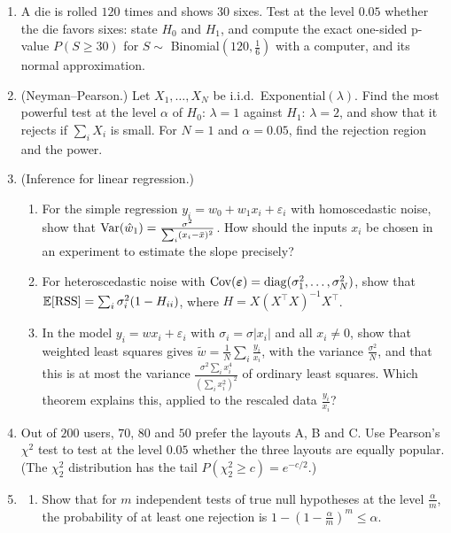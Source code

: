 \begin{enumerate}[leftmargin=*]
\begin{enumerate}[label=(\alph*)]
    \end{enumerate}
    \item \homework{} A die is rolled $120$ times and shows $30$ sixes. Test at the level $0.05$ whether the die favors sixes: state $H_0$ and $H_1$, and compute the exact one-sided p-value $P(S \geq 30)$ for $S \sim$ Binomial$(120, \frac{1}{6})$ with a computer, and its normal approximation.
    \item (Neyman--Pearson.) Let $X_1, \ldots, X_N$ be i.i.d.\ Exponential$(\lambda)$. Find the most powerful test at the level $\alpha$ of $H_0$: $\lambda = 1$ against $H_1$: $\lambda = 2$, and show that it rejects if $\sum_i X_i$ is small. For $N = 1$ and $\alpha = 0.05$, find the rejection region and the power.
    \item \homework{} (Inference for linear regression.)
    \begin{enumerate}[label=(\alph*)]
        \item For the simple regression $y_i = w_0 + w_1x_i + \varepsilon_i$ with homoscedastic noise, show that $\operatorname{Var}(\hat w_1) = \frac{\sigma^2}{\sum_i (x_i - \bar x)^2}$. How should the inputs $x_i$ be chosen in an experiment to estimate the slope precisely?
        \item For heteroscedastic noise with $\operatorname{Cov}(\boldsymbol{\varepsilon}) = \operatorname{diag}(\sigma_1^2, \ldots, \sigma_N^2)$, show that $\mathbb{E}[\mathrm{RSS}] = \sum_i \sigma_i^2(1 - H_{ii})$, where $H = X(X^\top X)^{-1}X^\top$.
        \item In the model $y_i = wx_i + \varepsilon_i$ with $\sigma_i = \sigma|x_i|$ and all $x_i \neq 0$, show that weighted least squares gives $\tilde w = \frac{1}{N}\sum_i \frac{y_i}{x_i}$, with the variance $\frac{\sigma^2}{N}$, and that this is at most the variance $\frac{\sigma^2\sum_i x_i^4}{(\sum_i x_i^2)^2}$ of ordinary least squares. Which theorem explains this, applied to the rescaled data $\frac{y_i}{x_i}$?
    \end{enumerate}
    \item Out of $200$ users, $70$, $80$ and $50$ prefer the layouts A, B and C. Use Pearson's $\chi^2$ test to test at the level $0.05$ whether the three layouts are equally popular. (The $\chi^2_2$ distribution has the tail $P(\chi^2_2 \geq c) = e^{-c/2}$.)
    \item \begin{enumerate}[label=(\alph*)]
        \item Show that for $m$ independent tests of true null hypotheses at the level $\frac{\alpha}{m}$, the probability of at least one rejection is $1 - (1 - \frac{\alpha}{m})^m \leq \alpha$.

\end{enumerate}
\end{enumerate}
